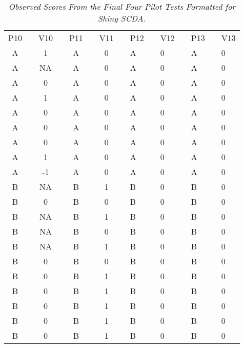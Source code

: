 \documentclass{article}
\begin{document}
  \begin{table}

  \caption{\emph{Observed }\emph{Scores }\emph{From} \emph{the Final Four} \emph{Pilot Tests Formatted for Shiny SCDA.} }
\label{Table 3}

  \begin{tabular}{c  c  c  c  c  c  c  c}

  P10 &   & V10 &   & P11 &   & V11 &   & P12 &   & V12 &   & P13 &   & V13 &  \\
A &   & 1 &   & A &   & 0 &   & A &   & 0 &   & A &   & 0 &  \\
A &   & NA &   & A &   & 0 &   & A &   & 0 &   & A &   & 0 &  \\
A &   & 0 &   & A &   & 0 &   & A &   & 0 &   & A &   & 0 &  \\
A &   & 1 &   & A &   & 0 &   & A &   & 0 &   & A &   & 0 &  \\
A &   & 0 &   & A &   & 0 &   & A &   & 0 &   & A &   & 0 &  \\
A &   & 0 &   & A &   & 0 &   & A &   & 0 &   & A &   & 0 &  \\
A &   & 0 &   & A &   & 0 &   & A &   & 0 &   & A &   & 0 &  \\
A &   & 1 &   & A &   & 0 &   & A &   & 0 &   & A &   & 0 &  \\
A &   & -1 &   & A &   & 0 &   & A &   & 0 &   & A &   & 0 &  \\
B &   & NA &   & B &   & 1 &   & B &   & 0 &   & B &   & 0 &  \\
B &   & 0 &   & B &   & 0 &   & B &   & 0 &   & B &   & 0 &  \\
B &   & NA &   & B &   & 1 &   & B &   & 0 &   & B &   & 0 &  \\
B &   & NA &   & B &   & 0 &   & B &   & 0 &   & B &   & 0 &  \\
B &   & NA &   & B &   & 1 &   & B &   & 0 &   & B &   & 0 &  \\
B &   & 0 &   & B &   & 0 &   & B &   & 0 &   & B &   & 0 &  \\
B &   & 0 &   & B &   & 1 &   & B &   & 0 &   & B &   & 0 &  \\
B &   & 0 &   & B &   & 1 &   & B &   & 0 &   & B &   & 0 &  \\
B &   & 0 &   & B &   & 1 &   & B &   & 0 &   & B &   & 0 &  \\
B &   & 0 &   & B &   & 1 &   & B &   & 0 &   & B &   & 0 &  \\
B &   & 0 &   & B &   & 1 &   & B &   & 0 &   & B &   & 0 &  \\

\end{tabular}
\end{table}
\end{document}
